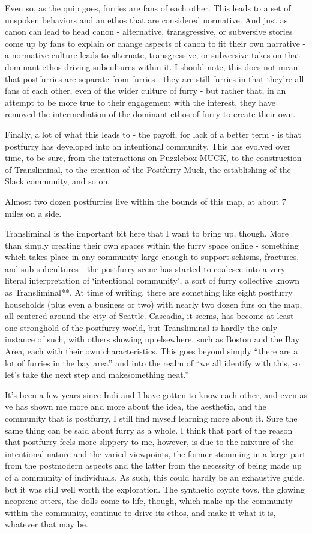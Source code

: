 Even so, as the quip goes, furries are fans of each other.{ }This leads to a set of unspoken behaviors and an ethos that are considered normative.{ }And just as canon can lead to head canon - alternative, transgressive, or subversive stories come up by fans to explain or change aspects of canon to fit their own narrative - a normative culture leads to alternate, transgressive, or subversive takes on that dominant ethos driving subcultures within it.{ }I should note, this does not mean that postfurries are separate from furries - they are still furries in that they're all fans of each other, even of the wider culture of furry - but rather that, in an attempt to be more true to their engagement with the interest, they have removed the intermediation of the dominant ethos of furry to create their own.

Finally, a lot of what this leads to - the payoff, for lack of a better term - is that postfurry has developed into an intentional community.{ }This has evolved over time, to be sure, from the interactions on Puzzlebox MUCK, to the construction of Transliminal, to the creation of the Postfurry Muck, the establishing of the Slack community, and so on.

Almost two dozen postfurries live within the bounds of this map, at about 7 miles on a side.

Transliminal is the important bit here that I want to bring up, though.{ }More than simply creating their own spaces within the furry space online - something which takes place in any community large enough to support schisms, fractures, and sub-subcultures - the postfurry scene has started to coalesce into a very literal interpretation of `intentional community', a sort of furry collective known as Transliminal**.{ }At time of writing, there are something like eight postfurry households (plus even a business or two) with nearly two dozen furs on the map, all centered around the city of Seattle.{ }Cascadia, it seems, has become at least one stronghold of the postfurry world, but Transliminal is hardly the only instance of such, with others showing up elsewhere, such as Boston and the Bay Area, each with their own characteristics.{ }This goes beyond simply ``there are a lot of furries in the bay area'' and into the realm of ``we all identify with this, so let's take the next step and makesomething neat.''

It's been a few years since Indi and I have gotten to know each other, and even as ve has shown me more and more about the idea, the aesthetic, and the community that is postfurry, I still find myself learning more about it.{ }Sure the same thing can be said about furry as a whole.{ }I think that part of the reason that postfurry feels more slippery to me, however, is due to the mixture of the intentional nature and the varied viewpoints, the former stemming in a large part from the postmodern aspects and the latter from the necessity of being made up of a community of individuals.{ }As such, this could hardly be an exhaustive guide, but it was still well worth the exploration.{ }The synthetic coyote toys, the glowing neoprene otters, the dolls come to life, though, which make up the community within the community, continue to drive its ethos, and make it what it is, whatever that may be.

